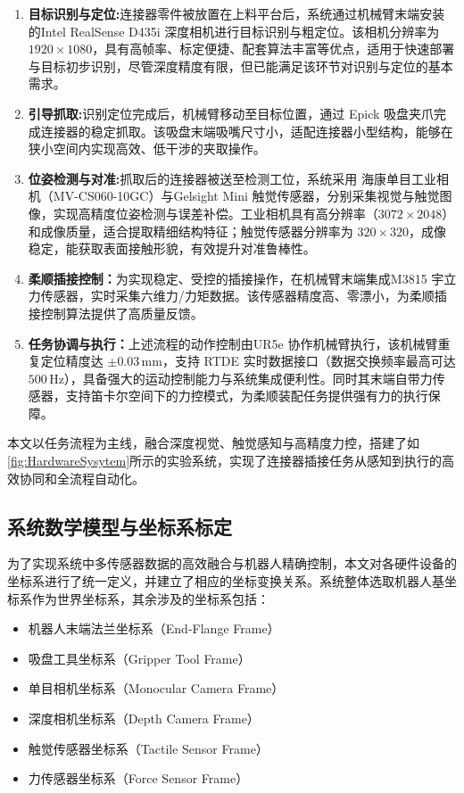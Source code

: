 \documentclass{Diploma}
\begin{document}
\begin{enumerate}
  \item \textbf{目标识别与定位:}连接器零件被放置在上料平台后，系统通过机械臂末端安装的Intel RealSense D435i 深度相机进行目标识别与粗定位。该相机分辨率为 $1920\times1080$，具有高帧率、标定便捷、配套算法丰富等优点，适用于快速部署与目标初步识别，尽管深度精度有限，但已能满足该环节对识别与定位的基本需求。
  \item \textbf{引导抓取:}识别定位完成后，机械臂移动至目标位置，通过 Epick 吸盘夹爪完成连接器的稳定抓取。该吸盘末端吸嘴尺寸小，适配连接器小型结构，能够在狭小空间内实现高效、低干涉的夹取操作。
  \item \textbf{位姿检测与对准:}抓取后的连接器被送至检测工位，系统采用 海康单目工业相机（MV-CS060-10GC）与Gelsight Mini 触觉传感器，分别采集视觉与触觉图像，实现高精度位姿检测与误差补偿。工业相机具有高分辨率（$3072\times2048$）和成像质量，适合提取精细结构特征；触觉传感器分辨率为 $320\times320$，成像稳定，能获取表面接触形貌，有效提升对准鲁棒性。
  \item \textbf{柔顺插接控制：}为实现稳定、受控的插接操作，在机械臂末端集成M3815 宇立力传感器，实时采集六维力/力矩数据。该传感器精度高、零漂小，为柔顺插接控制算法提供了高质量反馈。
  \item \textbf{任务协调与执行：}上述流程的动作控制由UR5e 协作机械臂执行，该机械臂重复定位精度达 $\pm0.03\,\mathrm{mm}$，支持 RTDE 实时数据接口（数据交换频率最高可达 $500\,\mathrm{Hz}$），具备强大的运动控制能力与系统集成便利性。同时其末端自带力传感器，支持笛卡尔空间下的力控模式，为柔顺装配任务提供强有力的执行保障。
\end{enumerate}

%

本文以任务流程为主线，融合深度视觉、触觉感知与高精度力控，搭建了如\ref{fig:HardwareSysytem}所示的实验系统，实现了连接器插接任务从感知到执行的高效协同和全流程自动化。
\subsection{系统数学模型与坐标系标定}
为了实现系统中多传感器数据的高效融合与机器人精确控制，本文对各硬件设备的坐标系进行了统一定义，并建立了相应的坐标变换关系。系统整体选取机器人基坐标系作为世界坐标系，其余涉及的坐标系包括：

\begin{itemize}
  \item 机器人末端法兰坐标系（End-Flange Frame）
  \item 吸盘工具坐标系（Gripper Tool Frame）
  \item 单目相机坐标系（Monocular Camera Frame）
  \item 深度相机坐标系（Depth Camera Frame）
  \item 触觉传感器坐标系（Tactile Sensor Frame）
  \item 力传感器坐标系（Force Sensor Frame）
\end{itemize}
\end{document}
